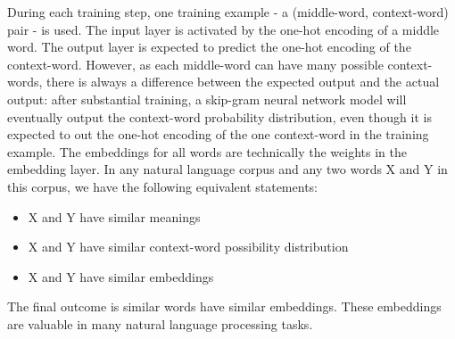 \documentclass[conference]{IEEEtran}
\begin{document}
During each training step, one training example - a (middle-word, context-word) pair - is used.
The input layer is activated by the one-hot encoding of a middle word.
The output layer is expected to predict the one-hot encoding of the context-word.
However, as each middle-word can have many possible context-words, there is always a difference between the expected output and the actual output:
after substantial training, a skip-gram neural network model will eventually output the context-word probability distribution,
even though it is expected to out the one-hot encoding of the one context-word in the training example.
The embeddings for all words are technically the weights in the embedding layer.
In any natural language corpus and any two words X and Y in this corpus, we have the following equivalent statements:
\begin{itemize}
	\item X and Y have similar meanings
	\item X and Y have similar context-word possibility distribution 
	\item X and Y have similar embeddings
\end{itemize}
The final outcome is similar words have similar embeddings.
These embeddings are valuable in many natural language processing tasks.
\end{document}
